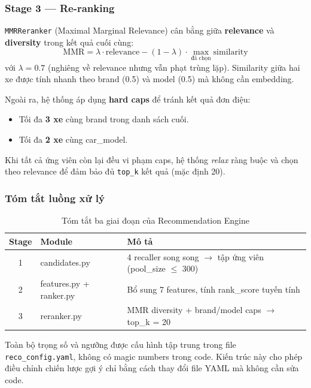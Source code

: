 \subsubsection{Stage 3 — Re-ranking}

\texttt{MMRReranker} (Maximal Marginal Relevance) cân bằng giữa \textbf{relevance} và \textbf{diversity} trong kết quả cuối cùng:
\[
\text{MMR} = \lambda \cdot \text{relevance} - (1 - \lambda) \cdot \max_{\text{đã chọn}} \text{similarity}
\]
với $\lambda = 0.7$ (nghiêng về relevance nhưng vẫn phạt trùng lặp). Similarity giữa hai xe được tính nhanh theo brand (0.5) và model (0.5) mà không cần embedding.

Ngoài ra, hệ thống áp dụng \textbf{hard caps} để tránh kết quả đơn điệu:
\begin{itemize}
    \item Tối đa \textbf{3 xe} cùng brand trong danh sách cuối.
    \item Tối đa \textbf{2 xe} cùng car\_model.
\end{itemize}

Khi tất cả ứng viên còn lại đều vi phạm caps, hệ thống \textit{relax} ràng buộc và chọn theo relevance để đảm bảo đủ \texttt{top\_k} kết quả (mặc định 20).

\subsubsection{Tóm tắt luồng xử lý}

\begin{table}[H]
\centering
\small
\caption{Tóm tắt ba giai đoạn của Recommendation Engine}
\label{tab:reco-stages}
\begin{tabular}{|c|l|l|}
\hline
\textbf{Stage} & \textbf{Module} & \textbf{Mô tả} \\
\hline
1 & candidates.py & 4 recaller song song $\rightarrow$ tập ứng viên (pool\_size $\leq$ 300) \\
\hline
2 & features.py + ranker.py & Bổ sung 7 features, tính rank\_score tuyến tính \\
\hline
3 & reranker.py & MMR diversity + brand/model caps $\rightarrow$ top\_k = 20 \\
\hline
\end{tabular}
\end{table}

Toàn bộ trọng số và ngưỡng được cấu hình tập trung trong file \texttt{reco\_config.yaml}, không có magic numbers trong code. Kiến trúc này cho phép điều chỉnh chiến lược gợi ý chỉ bằng cách thay đổi file YAML mà không cần sửa code.

